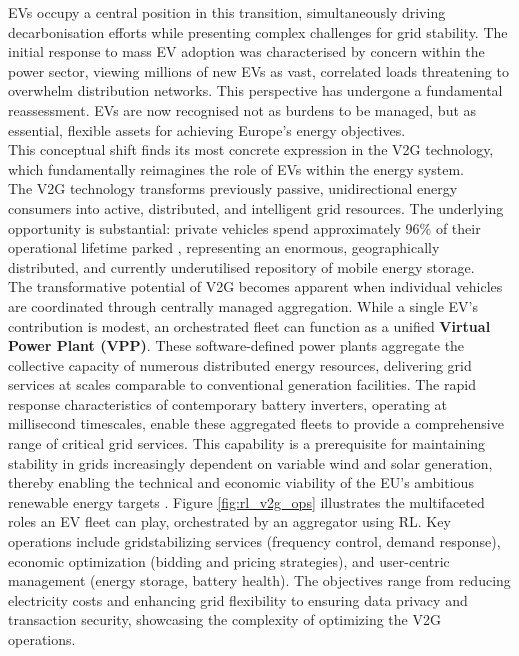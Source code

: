 \noindent
EVs occupy a central position in this transition, simultaneously driving decarbonisation efforts while presenting complex challenges for grid stability. The initial response to mass EV adoption was characterised by concern within the power sector, viewing millions of new EVs as vast, correlated loads threatening to overwhelm distribution networks. This perspective has undergone a fundamental reassessment. EVs are now recognised not as burdens to be managed, but as essential, flexible assets for achieving Europe's energy objectives.
\\
This conceptual shift finds its most concrete expression in the V2G technology, which fundamentally reimagines the role of EVs within the energy system.
\\
\noindent
The V2G technology transforms previously passive, unidirectional energy consumers into active, distributed, and intelligent grid resources. The underlying opportunity is substantial: private vehicles spend approximately 96\% of their operational lifetime parked \cite{Englberger2021}, representing an enormous, geographically distributed, and currently underutilised repository of mobile energy storage.
\\
\noindent
The transformative potential of V2G becomes apparent when individual vehicles are coordinated through centrally managed aggregation. While a single EV's contribution is modest, an orchestrated fleet can function as a unified \textbf{Virtual Power Plant (VPP)}. These software-defined power plants aggregate the collective capacity of numerous distributed energy resources, delivering grid services at scales comparable to conventional generation facilities. The rapid response characteristics of contemporary battery inverters, operating at millisecond timescales, enable these aggregated fleets to provide a comprehensive range of critical grid services. This capability is a prerequisite for maintaining stability in grids increasingly dependent on variable wind and solar generation, thereby enabling the technical and economic viability of the EU's ambitious renewable energy targets \cite{Tavakoli2019}.
\noindent
Figure \ref{fig:rl_v2g_ops} illustrates the multifaceted roles an EV fleet
can play, orchestrated by an aggregator using RL. Key operations include gridstabilizing services (frequency control, demand response), economic optimization
(bidding and pricing strategies), and user-centric management (energy storage,
battery health). The objectives range from reducing electricity costs and enhancing
grid flexibility to ensuring data privacy and transaction security, showcasing the
complexity of optimizing the V2G operations.

